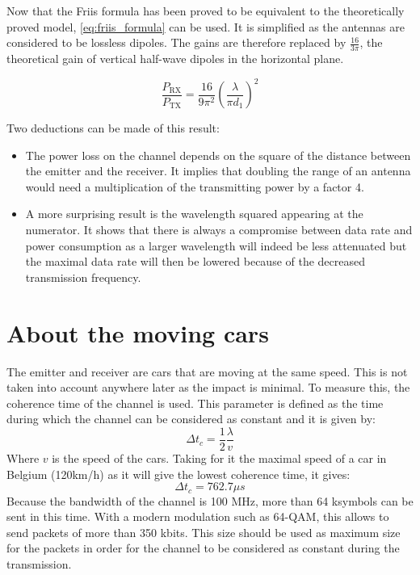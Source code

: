 \documentclass[10pt,a4paper]{ULBreport}
\begin{document}
Now that the Friis formula has been proved to be equivalent to the theoretically proved model, \ref{eq:friis_formula} can be used. It is simplified as the antennas are considered to be lossless dipoles. The gains are therefore replaced by $\frac{16}{3\pi}$, the theoretical gain of vertical half-wave dipoles in the horizontal plane.

\begin{equation}
    \frac{P_{\text{RX}}}{P_{\text{TX}}} = \frac{16}{9\pi^2} \left(\frac{\lambda}{\pi d_1}\right)^2
    \label{eq:power_friis_simplified}
\end{equation}

Two deductions can be made of this result: 
\begin{itemize}
    \item The power loss on the channel depends on the square of the distance between the emitter and the receiver. It implies that doubling the range of an antenna would need a multiplication of the transmitting power by a factor 4.
    \item A more surprising result is the wavelength squared appearing at the numerator. It shows that there is always a compromise between data rate and power consumption as a larger wavelength will indeed be less attenuated but the maximal data rate will then be lowered because of the decreased transmission frequency.
\end{itemize}

\section{About the moving cars}
The emitter and receiver are cars that are moving at the same speed. This is not taken into account anywhere later as the impact is minimal. To measure this, the coherence time of the channel is used. This parameter is defined as the time during which the channel can be considered as constant and it is given by:
\begin{equation*}
    \Delta t_c = \frac{1}{2}\frac{\lambda}{v}
\end{equation*}
Where $v$ is the speed of the cars. Taking for it the maximal speed of a car in Belgium (120km/h) as it will give the lowest coherence time, it gives:
\begin{equation*}
    \Delta t_c = 762.7\mu s
\end{equation*}
Because the bandwidth of the channel is 100 MHz, more than 64 ksymbols can be sent in this time. With a modern modulation such as 64-QAM, this allows to send packets of more than 350 kbits. This size should be used as maximum size for the packets in order for the channel to be considered as constant during the transmission. \\
\end{document}
